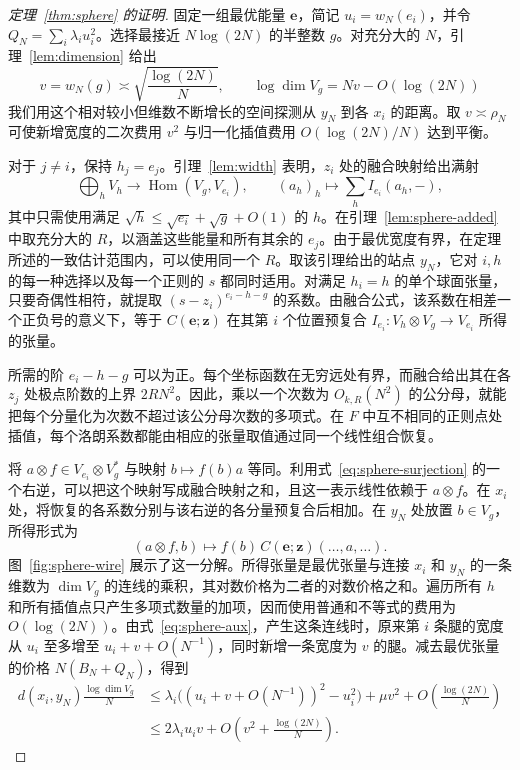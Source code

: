\begin{proof}[定理~\ref{thm:sphere} 的证明]
固定一组最优能量 \(\mathbf e\)，简记 \(u_i=w_N(e_i)\)，并令 \(Q_N=\sum_i\lambda_i u_i^2\)。选择最接近 \(N\log(2N)\) 的半整数 \(g\)。对充分大的 \(N\)，引理~\ref{lem:dimension} 给出
\begin{equation}\label{eq:sphere-testwidth}
 v=w_N(g)\asymp\sqrt{\frac{\log(2N)}{N}},
 \qquad
 \log\dim V_g=Nv-O(\log(2N))
\end{equation}
我们用这个相对较小但维数不断增长的空间探测从 \(y_N\) 到各 \(x_i\) 的距离。取 \(v\asymp\rho_N\) 可使新增宽度的二次费用 \(v^2\) 与归一化插值费用 \(O(\log(2N)/N)\) 达到平衡。

对于 \(j\ne i\)，保持 \(h_j=e_j\)。引理~\ref{lem:width} 表明，\(z_i\) 处的融合映射给出满射
\begin{equation}\label{eq:sphere-surjection}
 \bigoplus_h V_h\longrightarrow\operatorname{Hom}(V_g,V_{e_i}),
 \qquad (a_h)_h\longmapsto\sum_h I_{e_i}(a_h,-),
\end{equation}
其中只需使用满足 \(\sqrt h\le\sqrt{e_i}+\sqrt g+O(1)\) 的 \(h\)。在引理~\ref{lem:sphere-added} 中取充分大的 \(R\)，以涵盖这些能量和所有其余的 \(e_j\)。由于最优宽度有界，在定理所述的一致估计范围内，可以使用同一个 \(R\)。取该引理给出的站点 \(y_N\)，它对 \(i,h\) 的每一种选择以及每一个正则的 \(s\) 都同时适用。对满足 \(h_i=h\) 的单个球面张量，只要奇偶性相符，就提取 \((s-z_i)^{e_i-h-g}\) 的系数。由融合公式，该系数在相差一个正负号的意义下，等于 \(C(\mathbf e;\mathbf z)\) 在其第 \(i\) 个位置预复合 \(I_{e_i}:V_h\otimes V_g\to V_{e_i}\) 所得的张量。

所需的阶 \(e_i-h-g\) 可以为正。每个坐标函数在无穷远处有界，而融合给出其在各 \(z_j\) 处极点阶数的上界 \(2RN^2\)。因此，乘以一个次数为 \(O_{k,R}(N^2)\) 的公分母，就能把每个分量化为次数不超过该公分母次数的多项式。在 \(F\) 中互不相同的正则点处插值，每个洛朗系数都能由相应的张量取值通过同一个线性组合恢复。

将 \(a\otimes f\in V_{e_i}\otimes V_g^*\) 与映射 \(b\mapsto f(b)a\) 等同。利用式~\eqref{eq:sphere-surjection} 的一个右逆，可以把这个映射写成融合映射之和，且这一表示线性依赖于 \(a\otimes f\)。在 \(x_i\) 处，将恢复的各系数分别与该右逆的各分量预复合后相加。在 \(y_N\) 处放置 \(b\in V_g\)，所得形式为
\[
 (a\otimes f,b)\longmapsto f(b)\,
             C(\mathbf e;\mathbf z)(\ldots,a,\ldots).
\]
图~\ref{fig:sphere-wire} 展示了这一分解。所得张量是最优张量与连接 \(x_i\) 和 \(y_N\) 的一条维数为 \(\dim V_g\) 的连线的乘积，其对数价格为二者的对数价格之和。遍历所有 \(h\) 和所有插值点只产生多项式数量的加项，因而使用普通和不等式的费用为 \(O(\log(2N))\)。由式~\eqref{eq:sphere-aux}，产生这条连线时，原来第 \(i\) 条腿的宽度从 \(u_i\) 至多增至 \(u_i+v+O(N^{-1})\)，同时新增一条宽度为 \(v\) 的腿。减去最优张量的价格 \(N(B_N+Q_N)\)，得到
\begin{align*}
 d(x_i,y_N)\frac{\log\dim V_g}{N}
 &\le \lambda_i\bigl((u_i+v+O(N^{-1}))^2-u_i^2\bigr)
           +\mu v^2+O\!\left(\frac{\log(2N)}{N}\right)\\
 &\le 2\lambda_i u_i v+O\!\left(v^2+\frac{\log(2N)}{N}\right).
\end{align*}


\end{proof}
